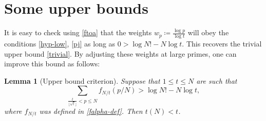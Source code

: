 \documentclass[10pt,a4paper,reqno]{amsart}
\numberwithin{equation}{section}
\theoremstyle{plain}
\newtheorem{lemma}[lemma]{Lemma}
\theoremstyle{definition}
\begin{document}
\FloatBarrier

\section{Some upper bounds}\label{upper-sec}

It is easy to check using \eqref{ftoa} that the weights $w_p \coloneqq \frac{\log p}{\log t}$ will obey the conditions \eqref{hyp-low}, \eqref{pj} as long as $0 > \log N! - N \log t$.  This recovers the trivial upper bound \eqref{trivial}.  By adjusting these weights at large primes, one can improve this bound as follows:

\begin{lemma}[Upper bound criterion]\label{upper-crit}  Suppose that $1 \leq t \leq N$ are such that
  \begin{equation}\label{contra}
     \sum_{\frac{t}{\lfloor\sqrt{t}\rfloor} < p \leq N} f_{N/t}(p/N) > \log N! - N \log t,
  \end{equation}
  where $f_{N/t}$ was defined in \eqref{falpha-def}.
  Then $t(N) < t$.
  \end{lemma}
\end{document}
